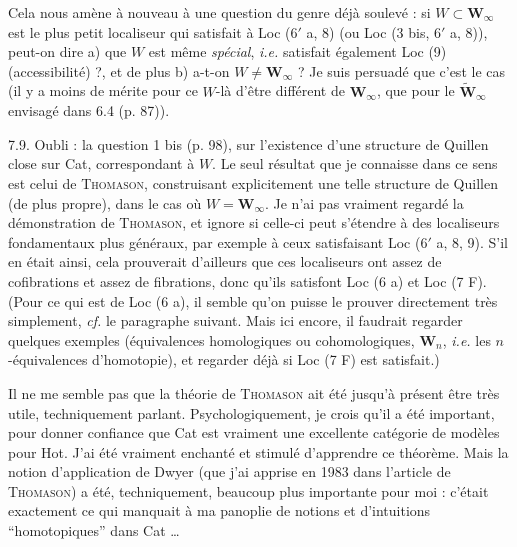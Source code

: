 \documentclass[11pt]{article}
\newcommand{\printedpage}[1]{\marginpar{\footnotesize p.~#1}}
\newcommand{\msp}[1]{\marginpar{\footnotesize [#1]}}
\begin{document}
Cela nous amène à nouveau à une question du genre déjà soulevé : si $W\subset\mathbf{W}_\infty$ est le plus petit localiseur qui satisfait à Loc (6$'$ a, 8) (ou Loc (3 bis, 6$'$ a, 8)), peut-on dire a) que $W$ est même \textit{spécial}, \textit{i.e.}
\msp{page 123}
satisfait également Loc (9) (accessibilité) ?, et de plus b) a-t-on $W\neq\mathbf{W}_\infty$ ? Je suis persuadé que c'est le cas (il y a moins de mérite pour ce $W$-là d'être différent de $\mathbf{W}_\infty$,
\printedpage{57}
que pour le $\tilde{\mathbf{W}}_\infty$ envisagé dans 6.4 (p. 87)).

7.9. Oubli : la question 1 bis (p. 98), sur l'existence d'une structure de Quillen close sur Cat, correspondant à $W$. Le seul résultat que je connaisse dans ce sens est celui de \textsc{Thomason}, construisant explicitement une telle structure de Quillen (de plus propre), dans le cas où $W=\mathbf{W}_\infty$. Je n'ai pas vraiment regardé la démonstration de \textsc{Thomason}, et ignore si celle-ci peut s'étendre à des localiseurs fondamentaux plus généraux, par exemple à ceux satisfaisant Loc (6$'$ a, 8, 9). S'il en était ainsi, cela prouverait d'ailleurs que ces localiseurs
\msp{page 124}
ont assez de cofibrations et assez de fibrations, donc qu'ils satisfont Loc (6 a) et Loc (7 F). (Pour ce qui est de Loc (6 a), il semble qu'on puisse le prouver directement très simplement, \textit{cf.} le paragraphe suivant. Mais ici encore, il faudrait regarder quelques exemples (équivalences homologiques ou cohomologiques, $\mathbf{W}_n$, \textit{i.e.} les $n$-équivalences d'homotopie), et regarder déjà si Loc (7 F) est satisfait.)

Il ne me semble pas que la théorie de \textsc{Thomason} ait été jusqu'à présent être très utile, techniquement parlant. Psychologiquement, je crois qu'il a été important, pour donner confiance que Cat est vraiment une excellente catégorie de modèles pour Hot. J'ai été vraiment enchanté et stimulé d'apprendre ce théorème. Mais la notion d'application de Dwyer (que j'ai apprise en 1983 dans l'article de \textsc{Thomason}) a été, techniquement, beaucoup plus importante pour moi : c'était exactement ce qui manquait à ma panoplie de notions et d'intuitions ``homotopiques'' dans Cat \dots
\end{document}
